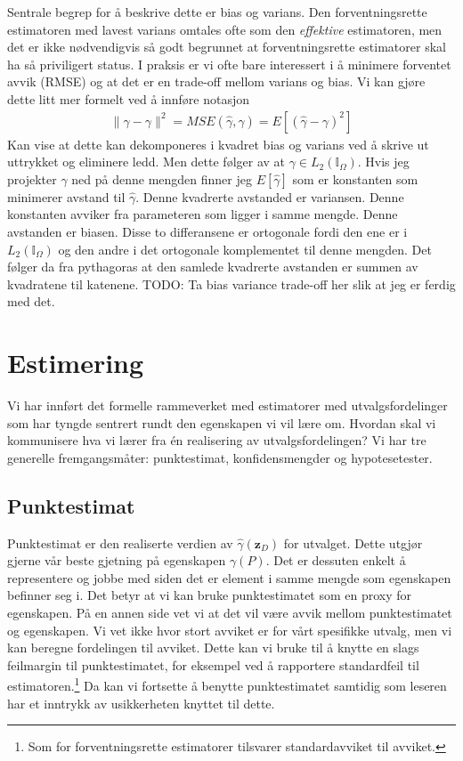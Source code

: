 Sentrale begrep for å beskrive dette er bias og varians. Den forventningsrette estimatoren med lavest varians omtales ofte som den \textit{effektive} estimatoren, men det er ikke nødvendigvis så godt begrunnet at forventningsrette estimatorer skal ha så priviligert status. I praksis er vi ofte bare interessert i å minimere forventet avvik (RMSE) og at det er en trade-off mellom varians og bias. 
Vi kan gjøre dette litt mer formelt ved å innføre notasjon
\begin{align}
\lVert \hat{\gamma}-\gamma \rVert^2 = MSE(\hat{\gamma},\gamma) = E[(\hat{\gamma}-\gamma)^2]
\end{align}
Kan vise at dette kan dekomponeres i kvadret bias og varians ved å skrive ut uttrykket og eliminere ledd. Men dette følger av at $\gamma \in L_2(\mathbb{I}_{\Omega})$. Hvis jeg projekter $\hat{\gamma}$ ned på denne mengden finner jeg $E[\hat{\gamma}]$ som er konstanten som minimerer avstand til $\hat{\gamma}$. Denne kvadrerte avstanded er variansen. Denne konstanten avviker fra parameteren som ligger i samme mengde. Denne avstanden er biasen. Disse to differansene er ortogonale fordi den ene er i $L_2(\mathbb{I}_{\Omega})$ og den andre i det ortogonale komplementet til denne mengden. Det følger da fra pythagoras at den samlede kvadrerte avstanden er summen av kvadratene til katenene. TODO: Ta bias variance trade-off her slik at jeg er ferdig med det.
\section{Estimering}
Vi har innført det formelle rammeverket med estimatorer med utvalgsfordelinger som har tyngde sentrert rundt den egenskapen vi vil lære om. Hvordan skal vi kommunisere hva vi lærer fra én realisering av utvalgsfordelingen? Vi har tre generelle fremgangsmåter: punktestimat, konfidensmengder og hypotesetester.
\subsection{Punktestimat}
Punktestimat er den realiserte verdien av $\hat{\gamma}(\mathbf{z}_D)$ for utvalget. Dette utgjør gjerne vår beste gjetning på egenskapen $\gamma(P)$. Det er dessuten enkelt å representere og jobbe med siden det er element i samme mengde som egenskapen befinner seg i. Det betyr at vi kan bruke punktestimatet som en proxy for egenskapen. På en annen side vet vi at det vil være avvik mellom punktestimatet og egenskapen. Vi vet ikke hvor stort avviket er for vårt spesifikke utvalg, men vi kan beregne fordelingen til avviket. Dette kan vi bruke til å knytte en slags feilmargin til punktestimatet, for eksempel ved å rapportere standardfeil til estimatoren.\footnote{Som for forventningsrette estimatorer tilsvarer standardavviket til avviket.} Da kan vi fortsette å benytte punktestimatet samtidig som leseren har et inntrykk av usikkerheten knyttet til dette.

